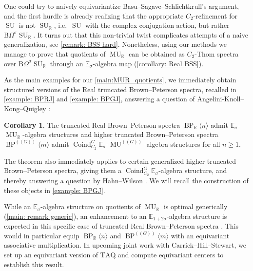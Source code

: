 \documentclass[a4paper, 10pt]{article}
\newcommand{\B}{\mathrm B}
\newcommand{\E}{\mathbb E}  %
\newcommand{\R}{\mathbb R}
\newcommand{\MU}{\operatorname{MU}}
\newcommand{\MUR}{{\MU_{\mathbb{R}}}}
\newcommand{\MUG}{{\MU^{(\!(G)\!)}}}
\newcommand{\BPG}{{\BP^{(\!(G)\!)}}}
\newcommand{\BPGm}{{\BP^{(\!(G)\!)}}\langle m\rangle}
\newcommand{\BP}{\operatorname{BP}}
\newcommand{\BPRn}{{\BP_{\mathbb{R}}\langle n\rangle}}
\newcommand{\Coind}{\operatorname{Coind}}
\newcommand{\SU}{\operatorname{SU}}
\theoremstyle{definition}
\newtheorem{maincor}[maincor]{Corollary}
\begin{document}
One could try to naively equivariantize Basu--Sagave--Schlichtkrull's argument, and the first hurdle is already realizing that the appropriate $C_2$-refinement for $\SU$ is not $\SU_{\R}$, i.e.~$\SU$ with the complex conjugation action, but rather $\B \Omega^{\sigma} \SU_{\R}$. It turns out that this non-trivial twist complicates attempts of a naive generalization, see \cref{remark: BSS hard}. Nonetheless, using our methods we manage to prove that quotients of $\MUR$ can be obtained as $C_2$-Thom spectra over $\B \Omega^{\sigma} \SU_{\R}$ through an $\E_{\sigma}$-algebra map (\cref{corollary: Real BSS}).

As the main examples for our \cref{main:MUR_quotients}, we immediately obtain structured versions of the Real truncated Brown--Peterson spectra, recalled in \cref{example: BPRJ} and \cref{example: BPGJ}, answering a question of Angelini-Knoll--Kong--Quigley \cite[Remark 5.7]{gabe2025realsyntomiccohomology}:

\begin{maincor}\label{main:BPRnkRn}
    The truncated Real Brown--Peterson spectra \(\BPRn\) admit \(\E_\sigma\)-\(\MUR\)-algebra structures and higher truncated Brown--Peterson spectra \(\BPG \langle m \rangle\) admit \(\Coind^{G}_{C_2}\E_\sigma\)-\(\MUG\)-algebra structures for all $n \geq 1$.
\end{maincor}

The theorem also immediately applies to certain generalized higher truncated Brown--Peterson spectra, giving them a $\Coind_{C_2}^G \E_{\sigma}$-algebra structure, and thereby answering a question by Hahn--Wilson \cite[Problem 5.5]{AimPL_equivstable_5}. We will recall the construction of these objects in \cref{example: BPGJ}.

While an $\E_{\sigma}$-algebra structure on quotients of $\MUR$ is optimal generically (\cref{main: remark generic}), an enhancement to an $\E_{1+2\sigma}$-algebra structure is expected in this specific case of truncated Real Brown--Peterson spectra \cite[Remark 1.0.14]{hahnWilson2022redshift}. This would in particular equip $\BPRn$ and $\BPGm$ with an equivariant associative multiplication. In upcoming joint work with Carrick--Hill--Stewart, we set up an equivariant version of $\mathrm{TAQ}$ and compute equivariant centers to establish this result.
\end{document}
